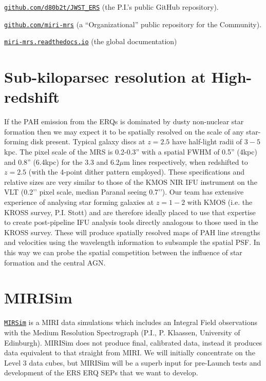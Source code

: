 \vspace{4pt}
\noindent
\href{https://github.com/d80b2t/JWST\_ERS}{{\tt github.com/d80b2t/JWST\_ERS}} (the P.I.'s public GitHub repository).
\vspace{4pt}

\noindent
\href{https://github.com/miri-mrs}{{\tt github.com/miri-mrs}} (a ``Organizational'' public repository for the Community).
\vspace{4pt}

\noindent
\href{http://miri-mrs.readthedocs.io/en/latest/}{{\tt miri-mrs.readthedocs.io}} (the global documentation)


\vspace{-6pt}
\section*{Sub-kiloparsec resolution at High-redshift}
\vspace{-6pt}
If the PAH emission from the ERQs is dominated by dusty non-nuclear
star formation then we may expect it to be spatially resolved on the
scale of any star-forming disk present. Typical galaxy discs at $z=2.5$
have half-light radii of $3-5$kpc. The pixel scale of the MRS is 0.2-0.3''  
with a spatial FWHM of 0.5'' (4kpc) and 0.8'' (6.4kpc) for the 3.3 and 6.2$\mu$m lines
respectively, when redshifted to $z=2.5$ (with the 4-point dither
pattern employed). These specifications and relative sizes are very
similar to those of the KMOS NIR IFU instrument on the VLT (0.2’’
pixel scale, median Paranal seeing 0.7’’). Our team has extensive
experience of analysing star forming galaxies at $z=1-2$ with KMOS
(i.e. the KROSS survey, P.I. Stott) and are
therefore ideally placed to use that expertise to create post-pipeline
IFU analysis tools directly analogous to those used in the KROSS
survey. These will produce spatially resolved maps of PAH line
strengths and velocities using the wavelength information to subsample
the spatial PSF. In this way we can probe the spatial competition
between the influence of star formation and the central AGN.

\section*{MIRISim}
\vspace{-6pt}
\href{http://www.miricle.org/MIRICLE2/devel/doc/mirisim/User_Guide/index.html}
{\tt MIRSim} is a MIRI data simulations which includes an Integral
Field observations with the Medium Resolution Spectrograph (P.I., P. Klaassen, 
University of Edinburgh).  MIRISim does not
produce final, calibrated data, instead it produces data equivalent to
that straight from MIRI. We will initially concentrate on the Level 3
data cubes, but MIRISim will be a superb input for pre-Launch tests
and development of the ERS ERQ SEPs that we want to develop.  


